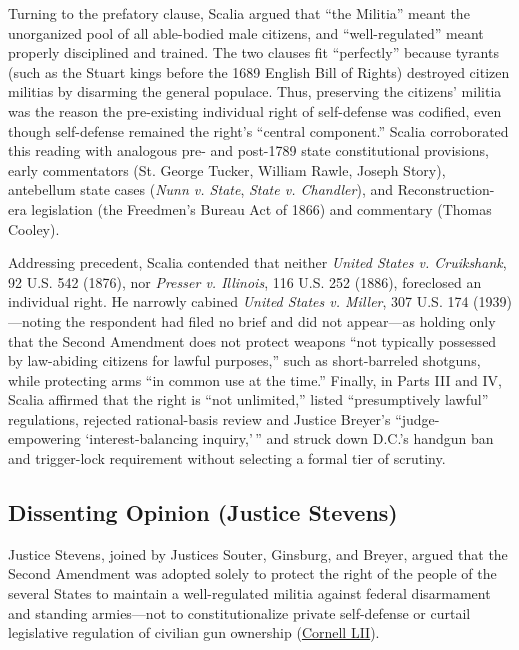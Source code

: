 \documentclass[12pt]{article}
\begin{document}
Turning to the prefatory clause, Scalia argued that ``the Militia'' meant the unorganized pool of all able-bodied male citizens, and ``well-regulated'' meant properly disciplined and trained. The two clauses fit ``perfectly'' because tyrants (such as the Stuart kings before the 1689 English Bill of Rights) destroyed citizen militias by disarming the general populace. Thus, preserving the citizens' militia was the reason the pre-existing individual right of self-defense was codified, even though self-defense remained the right's ``central component.'' Scalia corroborated this reading with analogous pre- and post-1789 state constitutional provisions, early commentators (St. George Tucker, William Rawle, Joseph Story), antebellum state cases (\textit{Nunn v. State}, \textit{State v. Chandler}), and Reconstruction-era legislation (the Freedmen's Bureau Act of 1866) and commentary (Thomas Cooley).

Addressing precedent, Scalia contended that neither \textit{United States v. Cruikshank}, 92 U.S. 542 (1876), nor \textit{Presser v. Illinois}, 116 U.S. 252 (1886), foreclosed an individual right. He narrowly cabined \textit{United States v. Miller}, 307 U.S. 174 (1939)---noting the respondent had filed no brief and did not appear---as holding only that the Second Amendment does not protect weapons ``not typically possessed by law-abiding citizens for lawful purposes,'' such as short-barreled shotguns, while protecting arms ``in common use at the time.'' Finally, in Parts III and IV, Scalia affirmed that the right is ``not unlimited,'' listed ``presumptively lawful'' regulations, rejected rational-basis review and Justice Breyer's ``judge-empowering `interest-balancing inquiry,'\,'' and struck down D.C.'s handgun ban and trigger-lock requirement without selecting a formal tier of scrutiny.

\subsection{Dissenting Opinion (Justice Stevens)}
Justice Stevens, joined by Justices Souter, Ginsburg, and Breyer, argued that the Second Amendment was adopted solely to protect the right of the people of the several States to maintain a well-regulated militia against federal disarmament and standing armies---not to constitutionalize private self-defense or curtail legislative regulation of civilian gun ownership (\href{https://www.law.cornell.edu/supct/html/07-290.ZD.html}{Cornell LII}).
\end{document}
